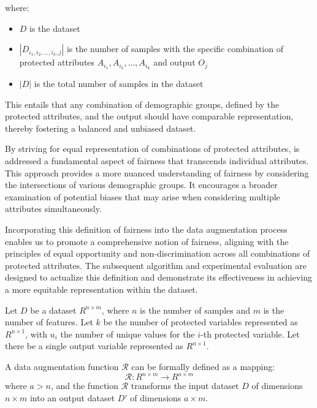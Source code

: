 where:
\begin{itemize}

    \item $D$ is the dataset

    \item $|D_{i_1, i_2, \ldots, i_k, j}|$ is the number of samples with the specific combination of protected attributes $A_{i_1}, A_{i_2}, \ldots, A_{i_k}$ and output $O_j$

    \item $|D|$ is the total number of samples in the dataset
    
\end{itemize}

This entails that any combination of demographic groups, defined by the protected attributes, and the output should have comparable representation, thereby fostering a balanced and unbiased dataset.

By striving for equal representation of combinations of protected attributes, is addressed a fundamental aspect of fairness that transcends individual attributes. This approach provides a more nuanced understanding of fairness by considering the intersections of various demographic groups. It encourages a broader examination of potential biases that may arise when considering multiple attributes simultaneously.

Incorporating this definition of fairness into the data augmentation process enables us to promote a comprehensive notion of fairness, aligning with the principles of equal opportunity and non-discrimination across all combinations of protected attributes. The subsequent algorithm and experimental evaluation are designed to actualize this definition and demonstrate its effectiveness in achieving a more equitable representation within the dataset.

Let $D$ be a dataset $R^{n \times m}$, where $n$ is the number of samples and $m$ is the number of features. Let $k$ be the number of protected variables represented as $R^{n \times 1}$, with $u_i$ the number of unique values for the $i$-th protected variable. Let there be a single output variable represented as $R^{n \times 1}$.

A data augmentation function $\mathcal{R}$ can be formally defined as a mapping:
\[
\mathcal{R}: R^{n \times m} \rightarrow R^{a \times m}
\]
where $a > n$, and the function $\mathcal{R}$ transforms the input dataset $D$ of dimensions $n \times m$ into an output dataset $D'$ of dimensions $a \times m$.

